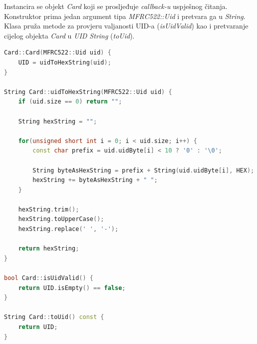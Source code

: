 Instancira se objekt \textit{Card} koji se prosljeđuje \textit{callback-u} uspješnog čitanja.
Konstruktor prima jedan argument tipa \textit{MFRC522::Uid} i pretvara ga u \textit{String}.
Klasa pruža metode za provjeru valjanosti UID-a (\textit{isUidValid}) kao i pretvaranje cijelog objekta \textit{Card} u
\textit{UID String} (\textit{toUid}).

\begin{lstlisting}[language=C++]
Card::Card(MFRC522::Uid uid) {
    UID = uidToHexString(uid);
}

String Card::uidToHexString(MFRC522::Uid uid) {
    if (uid.size == 0) return "";

    String hexString = "";

    for(unsigned short int i = 0; i < uid.size; i++) {
        const char prefix = uid.uidByte[i] < 10 ? '0' : '\0';

        String byteAsHexString = prefix + String(uid.uidByte[i], HEX);
        hexString += byteAsHexString + " ";
    }

    hexString.trim();
    hexString.toUpperCase();
    hexString.replace(' ', '-');

    return hexString;
}

bool Card::isUidValid() {
    return UID.isEmpty() == false;
}

String Card::toUid() const {
    return UID;
}
\end{lstlisting}
